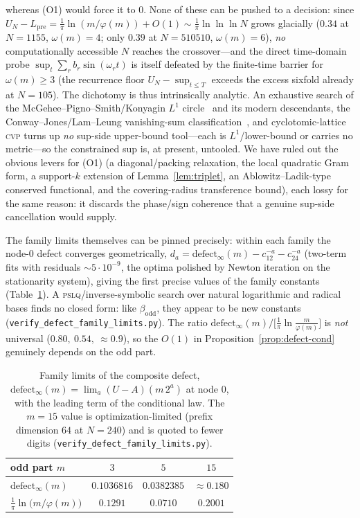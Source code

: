 whereas \textup{(O1)} would force it to $0$. None of these can be pushed to a decision: since
$U_N-L_{\mathrm{pre}}=\tfrac1\pi\ln(m/\varphi(m))+O(1)\sim\tfrac1\pi\ln\ln\ln N$ grows glacially ($0.34$ at
$N=1155$, $\omega(m)=4$; only $0.39$ at $N=510510$, $\omega(m)=6$), \emph{no} computationally accessible $N$ reaches the
crossover---and the direct time-domain probe $\sup_t\sum_r b_r\sin(\omega_r t)$ is itself defeated by the
finite-time barrier for $\omega(m)\ge3$ (the recurrence floor $U_N-\sup_{t\le T}$ exceeds the excess
sixfold already at $N=105$). The dichotomy is thus intrinsically analytic. An exhaustive search of the
McGehee--Pigno--Smith/Konyagin $L^1$ circle~\cite{MPS81,Konyagin81} and its modern descendants, the
Conway--Jones/Lam--Leung vanishing-sum classification~\cite{CJ,LamLeung}, and cyclotomic-lattice \textsc{cvp} turns up
\emph{no} sup-side upper-bound tool---each is $L^1$/lower-bound or carries no metric---so the constrained sup
is, at present, untooled. We have ruled out the obvious levers for \textup{(O1)} (a diagonal/packing
relaxation, the local quadratic Gram form, a support-$k$ extension of Lemma~\ref{lem:triplet}, an
Ablowitz--Ladik-type conserved functional, and the covering-radius transference bound), each lossy for the
same reason: it discards the phase/sign coherence that a genuine sup-side cancellation would supply.

The family limits themselves can be pinned precisely: within each family the node-$0$ defect converges
geometrically, $d_a=\mathrm{defect}_\infty(m)-c_12^{-a}-c_24^{-a}$ (two-term fits with residuals
$\sim5\cdot10^{-9}$, the optima polished by Newton iteration on the stationarity system), giving the first
precise values of the family constants (Table~\ref{tab:famlim}). A \textsc{pslq}/inverse-symbolic search
over natural logarithmic and radical bases finds no closed form: like $\beta_{\mathrm{odd}}$, they appear
to be new constants (\texttt{verify\_defect\_family\_limits.py}). The ratio
$\mathrm{defect}_\infty(m)\big/\bigl[\tfrac1\pi\ln\tfrac m{\varphi(m)}\bigr]$ is \emph{not} universal
($0.80,\ 0.54,\ \approx0.9$), so the $O(1)$ in Proposition~\ref{prop:defect-cond} genuinely depends on the
odd part.

\begin{table}[ht]\centering
\caption{Family limits of the composite defect, $\mathrm{defect}_\infty(m)=\lim_a(U-A)(m\,2^a)$ at node
$0$, with the leading term of the conditional law. The $m=15$ value is optimization-limited (prefix
dimension $64$ at $N=240$) and is quoted to fewer digits
(\texttt{verify\_defect\_family\_limits.py}).}\label{tab:famlim}
\begin{tabular}{lccc}
\toprule
odd part $m$ & $3$ & $5$ & $15$\\
\midrule
$\mathrm{defect}_\infty(m)$ & $0.1036816$ & $0.0382385$ & $\approx0.180$\\
$\tfrac1\pi\ln\bigl(m/\varphi(m)\bigr)$ & $0.1291$ & $0.0710$ & $0.2001$\\
\bottomrule
\end{tabular}
\end{table}

